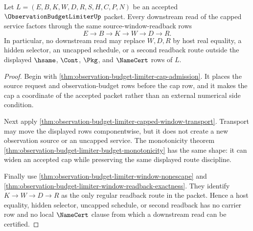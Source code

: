 \begin{theorem}
\label{thm:observation-budget-limiter-source-window-readback-lock}
Let $L=(E,B,K,W,D,R,S,H,C,P,N)$ be an accepted $\ObservationBudgetLimiterUp$ packet. Every downstream read of the capped service factors through the same source-window-readback rows
$$
E \to B \to K \to W \to D \to R.
$$
In particular, no downstream read may replace $W,D,R$ by host real equality, a hidden selector, an uncapped schedule, or a second readback route outside the displayed $\hsame$, $\Cont$, $\Pkg$, and $\NameCert$ rows of $L$.
\end{theorem}
\begin{proof}
Begin with \autoref{thm:observation-budget-limiter-cap-admission}. It places the source request and observation-budget rows before the cap row, and it makes the cap a coordinate of the accepted packet rather than an external numerical side condition.

Next apply \autoref{thm:observation-budget-limiter-capped-window-transport}. Transport may move the displayed rows componentwise, but it does not create a new observation source or an uncapped service. The monotonicity theorem \autoref{thm:observation-budget-limiter-budget-monotonicity} has the same shape: it can widen an accepted cap while preserving the same displayed route discipline.

Finally use \autoref{thm:observation-budget-limiter-window-nonescape} and \autoref{thm:observation-budget-limiter-window-readback-exactness}. They identify $K \to W \to D \to R$ as the only regular readback route in the packet. Hence a host equality, hidden selector, uncapped schedule, or second readback has no carrier row and no local $\NameCert$ clause from which a downstream read can be certified.
\end{proof}

